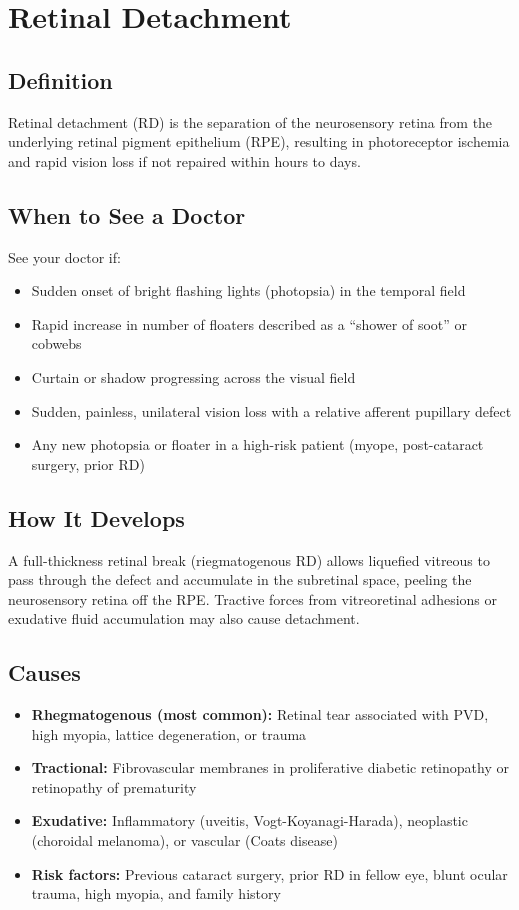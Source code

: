\chapter{Retinal Detachment}

\section*{Definition}
Retinal detachment (RD) is the separation of the neurosensory retina from the underlying retinal pigment epithelium (RPE), resulting in photoreceptor ischemia and rapid vision loss if not repaired within hours to days.

\section*{When to See a Doctor}
See your doctor if:
\begin{itemize}
  \item Sudden onset of bright flashing lights (photopsia) in the temporal field
  \item Rapid increase in number of floaters described as a ``shower of soot'' or cobwebs
  \item Curtain or shadow progressing across the visual field
  \item Sudden, painless, unilateral vision loss with a relative afferent pupillary defect
  \item Any new photopsia or floater in a high-risk patient (myope, post-cataract surgery, prior RD)
\end{itemize}

\section*{How It Develops}
A full-thickness retinal break (riegmatogenous RD) allows liquefied vitreous to pass through the defect and accumulate in the subretinal space, peeling the neurosensory retina off the RPE. Tractive forces from vitreoretinal adhesions or exudative fluid accumulation may also cause detachment.

\section*{Causes}
\begin{itemize}
  \item \textbf{Rhegmatogenous (most common):} Retinal tear associated with PVD, high myopia, lattice degeneration, or trauma
  \item \textbf{Tractional:} Fibrovascular membranes in proliferative diabetic retinopathy or retinopathy of prematurity
  \item \textbf{Exudative:} Inflammatory (uveitis, Vogt-Koyanagi-Harada), neoplastic (choroidal melanoma), or vascular (Coats disease)
  \item \textbf{Risk factors:} Previous cataract surgery, prior RD in fellow eye, blunt ocular trauma, high myopia, and family history
\end{itemize}

